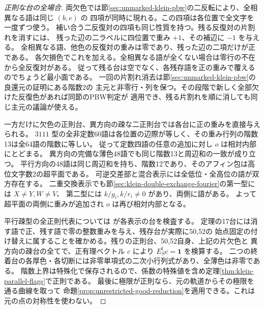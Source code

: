 \begin{proof}[正則な台の全場合]
両欠色では節\ref{sec:unmarked-klein-pbw}の二反転により、全相異なる語は同じ $(b,e)$ の
四項が同時に現れる。この四項は各位置で全文字を一度ずつ使う。
補い合う二反復対の四項も同じ性質を持つ。残る反復対の片割れを消すには、
残った辺の二ラベルに四位置で重み $+1$、その補辺に $-1$ を与える。
全相異なる語、他色の反復対の重みは零であり、残った辺の二項だけが正である。
各欠損色でこれを加える。全相異なる語が全くない場合は零行の不在から全反復対がある。
従って残る台は空でなく、各残存語を正の重みで覆えるのでちょうど最小面である。
一回の片割れ消去は節\ref{sec:unmarked-klein-pbw}の良還元の証明にある階数2の
主元と非零行・列を保つ。その段階で新しく全部欠けた反復色があれば同節のPBW判定が
適用でき、残る片割れを順に消しても同じ主元の議論が使える。

一方だけに欠色の正則台、異方向の疎な二正則台では各台に正の重みを直接与えられる。
$3111$ 型の全非定数60語は各位置の辺際が等しく、その重み行列の階数13は全64語の階数に等しい。
従って定数四語の任意の追加に対し $o$ は相対内部にとどまる。
異方向の完備な薄色48語でも同じ階数13と周辺和の一致が成り立つ。
平行方向の48語は同じ周辺和を持ち、階数12であり、そのアフィン包は高位文字数2の超平面である。
可逆交差部と混合表示には全低位・全高位の語が双方存在する。
二重交換表示でも節\ref{sec:klein-double-exchange-fourier}の第一型には $X\ne Y,W\ne V$、
第二型には $k/g_i,k/r_i\ne0$ があり、両側に語がある。
よって超平面の両側に重みが追加され $o$ は再び相対内部となる。

平行疎型の全正則代表については
 が各表示の台を検査する。
定理の17台には消す語で正、残す語で零の整数重みを与え、残存台が実際に50,52の
始点固定の付け替えに属することを確かめる。残りの正則台、50,52自身、上記の片欠色と
異方向の疎台の全てで、正有理ベクトル $c$ により $E_S^{\mathsf t}c=\boldsymbol1$ を検算する。
二つの終着台の各厚色・各切断には非零単項式の二次小行列式があり、全薄色は非零である。
階数上界は特殊化で保存されるので、係数の特殊値を含め定理\ref{thm:klein-parallel-flags}で正則である。
最後に極限が正則なら、元の軌道からその極限を通る曲線を取って
命題\ref{prop:unrestricted-good-reduction}を適用できる。これは元の点の対称性を使わない。
\end{proof}

